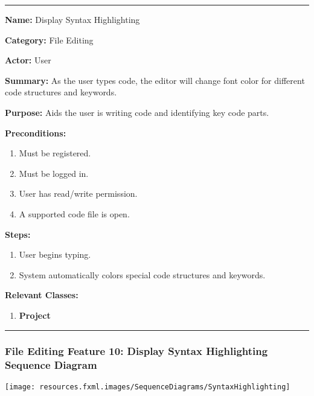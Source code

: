 \documentclass[twoside,letterpaper]{article}
\begin{document}
\vspace{2pt}
\hrule
\vspace{8pt}
	\noindent\textbf{Name:} Display Syntax Highlighting \newline
	
	\noindent\textbf{Category:} File Editing \newline
	
	\noindent\textbf{Actor:} User \newline
	
	\noindent\textbf{Summary:} As the user types code, the editor will change font color for different code structures and keywords. \newline
	
	\noindent\textbf{Purpose:} Aids the user is writing code and identifying key code parts. \newline
	
	\noindent\textbf{Preconditions:}
	\begin{enumerate}
		\item Must be registered.
		\item Must be logged in.
		\item User has read/write permission.
		\item A supported code file is open.
	\end{enumerate}
	\noindent\textbf{Steps:}
	\begin{enumerate}
		\item User begins typing.
		\item System automatically colors special code structures and keywords.
	\end{enumerate}
	\noindent\textbf{Relevant Classes:}
	\begin{enumerate}
	    \item \textbf {Project}
	\end{enumerate}
\vspace{8pt}
\hrule
\newpage

\subsubsection[File Editing Feature 10: Display Syntax Highlighting Sequence Diagram]{\rmfamily\bfseries\color{black}
	File Editing Feature 10: Display Syntax Highlighting Sequence Diagram}
\hypertarget{RefHeading22059017292}{}

\bigskip

\texttt{[image: resources.fxml.images/SequenceDiagrams/SyntaxHighlighting]}
\end{document}
